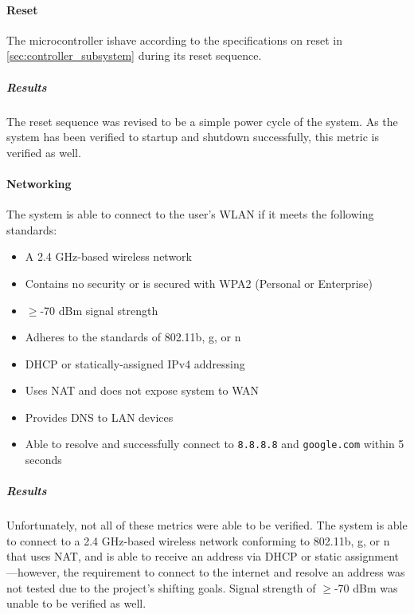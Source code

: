 \paragraph{Reset} The microcontroller ishave according to the specifications on reset in \autoref{sec:controller_subsystem} during its reset sequence.
\subparagraph{Results} The reset sequence was revised to be a simple power cycle of the system. As the system has been verified to startup and shutdown successfully, this metric is verified as well.

\paragraph{Networking} The system is able to connect to the user's WLAN if it meets the following standards:
\begin{itemize}
    \item A 2.4 GHz-based wireless network
    \item Contains no security or is secured with WPA2 (Personal or Enterprise)
    \item $\geq$-70 dBm signal strength
    \item Adheres to the standards of 802.11b, g, or n
    \item DHCP or statically-assigned IPv4 addressing
    \item Uses NAT and does not expose system to WAN
    \item Provides DNS to LAN devices
    \item Able to resolve and successfully connect to \texttt{8.8.8.8} and \texttt{google.com} within 5 seconds
\end{itemize}
\subparagraph{Results} Unfortunately, not all of these metrics were able to be verified. The system is able to connect to a 2.4 GHz-based wireless network conforming to 802.11b, g, or n that uses NAT, and is able to receive an address via DHCP or static assignment---however, the requirement to connect to the internet and resolve an address was not tested due to the project's shifting goals. Signal strength of $\geq$-70 dBm was unable to be verified as well.